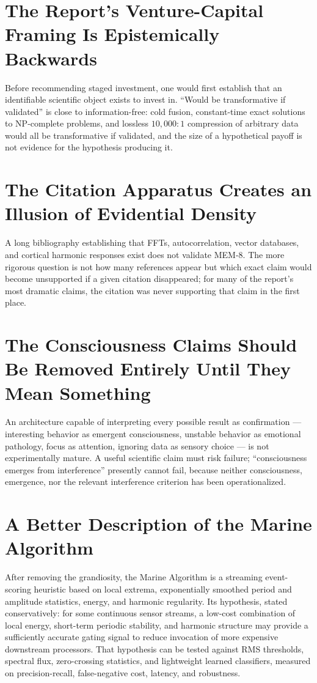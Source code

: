 \documentclass[12pt]{article}
\begin{document}
\section{The Report's Venture-Capital Framing Is Epistemically Backwards}

Before recommending staged investment, one would first establish that an identifiable scientific object exists to invest in. ``Would be transformative if validated'' is close to information-free: cold fusion, constant-time exact solutions to NP-complete problems, and lossless $10{,}000{:}1$ compression of arbitrary data would all be transformative if validated, and the size of a hypothetical payoff is not evidence for the hypothesis producing it.

\section{The Citation Apparatus Creates an Illusion of Evidential Density}

A long bibliography establishing that FFTs, autocorrelation, vector databases, and cortical harmonic responses exist does not validate MEM-8. The more rigorous question is not how many references appear but which exact claim would become unsupported if a given citation disappeared; for many of the report's most dramatic claims, the citation was never supporting that claim in the first place.

\section{The Consciousness Claims Should Be Removed Entirely Until They Mean Something}

An architecture capable of interpreting every possible result as confirmation — interesting behavior as emergent consciousness, unstable behavior as emotional pathology, focus as attention, ignoring data as sensory choice — is not experimentally mature. A useful scientific claim must risk failure; ``consciousness emerges from interference'' presently cannot fail, because neither consciousness, emergence, nor the relevant interference criterion has been operationalized.

\section{A Better Description of the Marine Algorithm}

After removing the grandiosity, the Marine Algorithm is a streaming event-scoring heuristic based on local extrema, exponentially smoothed period and amplitude statistics, energy, and harmonic regularity. Its hypothesis, stated conservatively: for some continuous sensor streams, a low-cost combination of local energy, short-term periodic stability, and harmonic structure may provide a sufficiently accurate gating signal to reduce invocation of more expensive downstream processors. That hypothesis can be tested against RMS thresholds, spectral flux, zero-crossing statistics, and lightweight learned classifiers, measured on precision-recall, false-negative cost, latency, and robustness.
\end{document}
